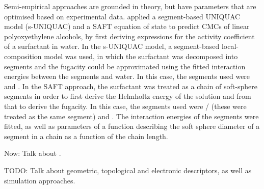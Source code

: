 Semi-empirical approaches are grounded in theory, but have parameters that are
optimised based on experimental data. \citet{liStudiesUNIQUACSAFT1998} applied a
segment-based UNIQUAC model (s-UNIQUAC) and a SAFT equation of state to predict
CMCs of linear polyoxyethylene alcohols, by first deriving expressions for the
activity coefficient of a surfactant in water. In the s-UNIQUAC model, a
segment-based local-composition model was used, in which the surfactant was
decomposed into segments and the fugacity could be approximated using the fitted
interaction energies between the segments and water. In this case, the segments
used were  and . In the SAFT approach, the surfactant was
treated as a chain of soft-sphere segments in order to first derive the
Helmholtz energy of the solution and from that to derive the fugacity. In this
case, the segments used were / (these were treated as the same
segment) and . The interaction energies of the segments were fitted,
as well as parameters of a function describing the soft sphere diameter of a
segment in a chain as a function of the chain length.

Now: Talk about \citet{chengCorrelationCriticalMicelle2005}.

TODO: Talk about geometric, topological and electronic descriptors, as well as
simulation approaches.
